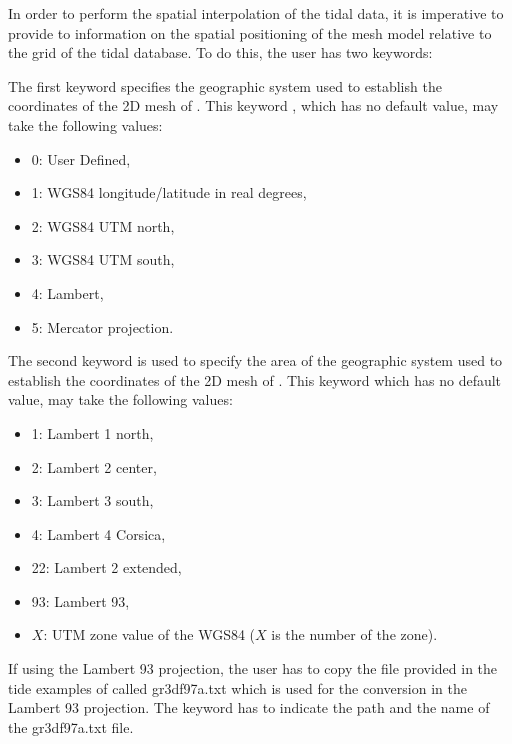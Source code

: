In order to perform the spatial interpolation of the tidal data, it is
imperative to provide to  information on the spatial positioning of
the mesh model relative to the grid of the tidal database. To do this, the user
has two keywords:

The first keyword specifies the geographic system used to establish the
coordinates of the 2D mesh of . This keyword , which has no default value, may take the following values:

\begin{itemize}
\item 0: User Defined,

\item 1: WGS84 longitude/latitude in real degrees,

\item 2: WGS84 UTM north,

\item 3: WGS84 UTM south,

\item 4: Lambert,

\item 5: Mercator projection.
\end{itemize}

The second keyword is used to specify the area of the geographic system used to
establish the coordinates of the 2D mesh of . This keyword
 which has no default value, may take
the following values:

\begin{itemize}
\item 1: Lambert 1 north,

\item 2: Lambert 2 center,

\item 3: Lambert 3 south,

\item 4: Lambert 4 Corsica,

\item 22: Lambert 2 extended,

\item 93: Lambert 93,

\item $X$: UTM zone value of the WGS84 ($X$ is the number of the
zone).
\end{itemize}

If using the Lambert 93 projection, the user has to copy the file provided
in the tide examples of  called gr3df97a.txt which is used
for the conversion in the Lambert 93 projection.
The keyword  has to indicate the path
and the name of the gr3df97a.txt file.
\\

